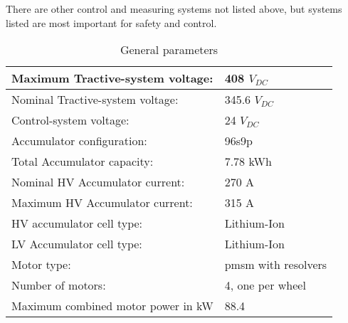 There are other control and measuring systems not listed above, but systems listed are most important for safety and control.


\begin{table}[H]
	\centering
	\caption{General parameters}
	\begin{tabu}{|X|X|}
		\hline
		Maximum Tractive-system voltage: & 408 $V_{DC}$  \\
		\hline Nominal Tractive-system voltage: & 345.6 $V_{DC}$\\
		\hline
		Control-system voltage: & 24 $V_{DC}$ \\
		\hline
		Accumulator configuration: & 96s9p \\
		\hline
		Total Accumulator capacity: & 7.78 kWh\\
		\hline
		Nominal HV Accumulator current: & 270 A \\
		\hline
		Maximum HV Accumulator current: & 315 A \\
		\hline
		HV accumulator cell type: & Lithium-Ion  \\
		\hline
		LV Accumulator cell type: & Lithium-Ion \\
		\hline
		Motor type: & \gls{pmsm} with resolvers \\
		\hline
		Number of motors: &  4, one per wheel \\
		\hline
		Maximum combined motor power in kW & 88.4 \\
		\hline
	\end{tabu}%
	\label{tab:system-general}%
\end{table}%
